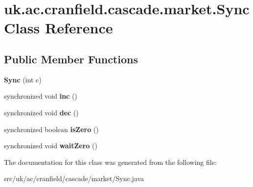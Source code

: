 \hypertarget{classuk_1_1ac_1_1cranfield_1_1cascade_1_1market_1_1_sync}{\section{uk.\-ac.\-cranfield.\-cascade.\-market.\-Sync Class Reference}
\label{classuk_1_1ac_1_1cranfield_1_1cascade_1_1market_1_1_sync}
}
\subsection*{Public Member Functions}
\begin{DoxyCompactItemize}
\item 
\hypertarget{classuk_1_1ac_1_1cranfield_1_1cascade_1_1market_1_1_sync_a4b444c37d1e8fba45b5a75fffe43c81c}{{\bfseries Sync} (int c)}\label{classuk_1_1ac_1_1cranfield_1_1cascade_1_1market_1_1_sync_a4b444c37d1e8fba45b5a75fffe43c81c}

\item 
\hypertarget{classuk_1_1ac_1_1cranfield_1_1cascade_1_1market_1_1_sync_a8d6df0d50c377c6b05268a4bdba8c524}{synchronized void {\bfseries inc} ()}\label{classuk_1_1ac_1_1cranfield_1_1cascade_1_1market_1_1_sync_a8d6df0d50c377c6b05268a4bdba8c524}

\item 
\hypertarget{classuk_1_1ac_1_1cranfield_1_1cascade_1_1market_1_1_sync_ac1d9637a8d0ef828b6ad8ec5ab30d895}{synchronized void {\bfseries dec} ()}\label{classuk_1_1ac_1_1cranfield_1_1cascade_1_1market_1_1_sync_ac1d9637a8d0ef828b6ad8ec5ab30d895}

\item 
\hypertarget{classuk_1_1ac_1_1cranfield_1_1cascade_1_1market_1_1_sync_ac58bdd9ceeebeada4fb1bcb9f32f0962}{synchronized boolean {\bfseries is\-Zero} ()}\label{classuk_1_1ac_1_1cranfield_1_1cascade_1_1market_1_1_sync_ac58bdd9ceeebeada4fb1bcb9f32f0962}

\item 
\hypertarget{classuk_1_1ac_1_1cranfield_1_1cascade_1_1market_1_1_sync_aec982e6ffc6d86a5cde071dcac03fedb}{synchronized void {\bfseries wait\-Zero} ()}\label{classuk_1_1ac_1_1cranfield_1_1cascade_1_1market_1_1_sync_aec982e6ffc6d86a5cde071dcac03fedb}

\end{DoxyCompactItemize}


The documentation for this class was generated from the following file\-:\begin{DoxyCompactItemize}
\item 
src/uk/ac/cranfield/cascade/market/Sync.\-java\end{DoxyCompactItemize}
